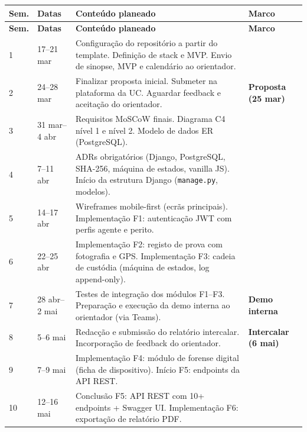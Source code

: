 \documentclass[a4paper,11pt]{article}
\begin{document}
\begin{longtable}{@{}llp{7.5cm}l@{}}
\toprule
\textbf{Sem.} & \textbf{Datas} & \textbf{Conteúdo planeado} & \textbf{Marco} \\
\midrule
\endfirsthead
\toprule
\textbf{Sem.} & \textbf{Datas} & \textbf{Conteúdo planeado} & \textbf{Marco} \\
\midrule
\endhead

1 & 17--21 mar &
  Configuração do repositório a partir do template.
  Definição de stack e MVP. Envio de sinopse, MVP e calendário ao orientador. &  \\
\midrule

2 & 24--28 mar &
  Finalizar proposta inicial. Submeter na plataforma da UC.
  Aguardar feedback e aceitação do orientador. &
  \textbf{Proposta (25 mar)} \\
\midrule

3 & 31 mar--4 abr &
  Requisitos MoSCoW finais. Diagrama C4 nível 1 e nível 2.
  Modelo de dados ER (PostgreSQL). &  \\
\midrule

4 & 7--11 abr &
  ADRs obrigatórios (Django, PostgreSQL, SHA-256, máquina de estados, vanilla JS).
  Início da estrutura Django (\texttt{manage.py}, modelos). &  \\
\midrule

5 & 14--17 abr &
  Wireframes mobile-first (ecrãs principais).
  Implementação F1: autenticação JWT com perfis agente e perito. &  \\
\midrule

6 & 22--25 abr &
  Implementação F2: registo de prova com fotografia e GPS.
  Implementação F3: cadeia de custódia (máquina de estados, log append-only). &  \\
\midrule

7 & 28 abr--2 mai &
  Testes de integração dos módulos F1--F3. Preparação e execução da demo interna
  ao orientador (via Teams). &
  \textbf{Demo interna} \\
\midrule

8 & 5--6 mai &
  Redacção e submissão do relatório intercalar.
  Incorporação de feedback do orientador. &
  \textbf{Intercalar (6 mai)} \\
\midrule

9 & 7--9 mai &
  Implementação F4: módulo de forense digital (ficha de dispositivo).
  Início F5: endpoints da API REST. &  \\
\midrule

10 & 12--16 mai &
  Conclusão F5: API REST com 10+ endpoints + Swagger UI.
  Implementação F6: exportação de relatório PDF. &  \\
\midrule


\end{longtable}
\end{document}
